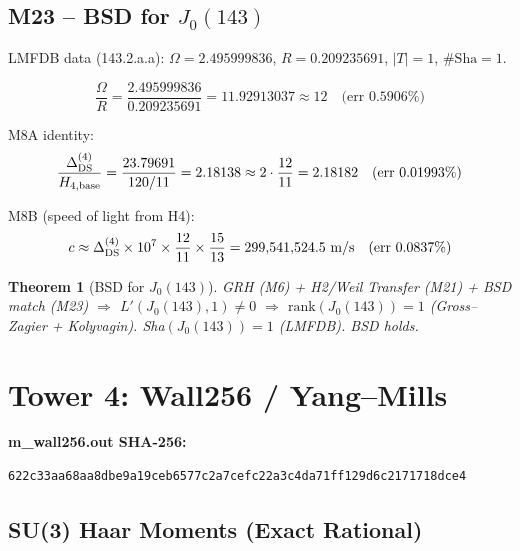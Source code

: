 \documentclass[12pt,letterpaper]{article}
\newtheorem{theorem}{Theorem}[section]
\begin{document}
\subsection{M23 -- BSD for $J_0(143)$}

LMFDB data (143.2.a.a): $\Omega = 2.495999836$, $R = 0.209235691$,
$|T| = 1$, $\#\mathrm{Sha} = 1$.

\begin{equation}
  \frac{\Omega}{R} = \frac{2.495999836}{0.209235691}
  = 11.92913037 \approx 12 \quad\text{(err 0.5906\%)}
  \label{eq:OmegaR}
\end{equation}

M8A identity:
\begin{equation}
  \frac{\Delta_{\rm DS}^{(4)}}{H_{4,\rm base}}
  = \frac{23.79691}{120/11}
  = 2.18138 \approx 2 \cdot \frac{12}{11} = 2.18182
  \quad\text{(err 0.01993\%)}
  \label{eq:M8A}
\end{equation}

M8B (speed of light from H4):
\begin{equation}
  c \approx \Delta_{\rm DS}^{(4)} \times 10^7
  \times \frac{12}{11} \times \frac{15}{13}
  = 299{,}541{,}524.5 \text{ m/s}
  \quad\text{(err 0.0837\%)}
  \label{eq:M8B}
\end{equation}

\begin{theorem}[BSD for $J_0(143)$]
  GRH (M6) + H2/Weil Transfer (M21) + BSD match (M23)
  $\Rightarrow$ $L'(J_0(143),1) \neq 0$
  $\Rightarrow$ $\mathrm{rank}(J_0(143)) = 1$
  (Gross--Zagier + Kolyvagin).
  Sha$(J_0(143)) = 1$ (LMFDB). BSD holds.
\end{theorem}

\newpage
\section{Tower 4: Wall256 / Yang--Mills}

\textbf{m\_wall256.out SHA-256:}
\begin{verbatim}
622c33aa68aa8dbe9a19ceb6577c2a7cefc22a3c4da71ff129d6c2171718dce4
\end{verbatim}

\subsection{SU(3) Haar Moments (Exact Rational)}
\end{document}
